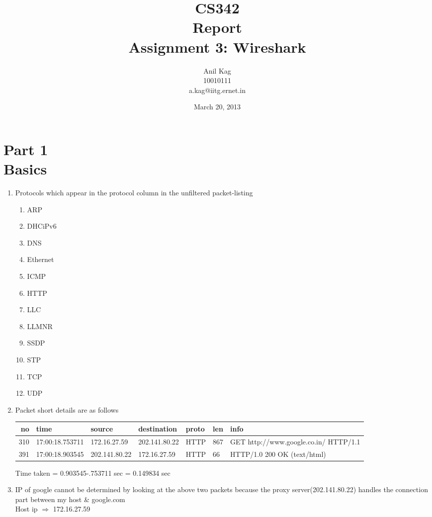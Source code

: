 \documentclass[a4,11pt]{article}
\begin{document}
\title{CS342 \\
	Report\\
	Assignment 3: Wireshark}
\author{Anil Kag\\
	   10010111\\
	   a.kag@iitg.ernet.in}
\date{March 20, 2013}
\maketitle

\section{Part 1\\
	  Basics}
\begin{enumerate}
 \item Protocols which appear in the protocol column in the unfiltered packet-listing
    \begin{multicols}{3}
      \begin{enumerate}
      \item ARP  	\item DHCiPv6
      \item DNS 	\item Ethernet 
      \item ICMP      	\item HTTP
      \item LLC        \item LLMNR
      \item SSDP       \item STP 
      \item TCP       	\item UDP
      \end{enumerate}
    \end{multicols}
    
    \item  Packet short details are as follows \\
      \begin{adjustwidth}{-2cm}{}
      \begin{tabular}{|r|l|l|l|l|l| p{4cm} |}
       \hline
       no&	time&			source&			destination&		proto&	len&	info \\
       \hline
       310& 	17:00:18.753711& 	172.16.27.59& 		202.141.80.22& 		HTTP& 	867& 	GET http://www.google.co.in/ HTTP/1.1 \\
       391& 	17:00:18.903545&	202.141.80.22&		172.16.27.59&		HTTP&	66&	HTTP/1.0 200 OK  (text/html)\\
       \hline
      \end{tabular}
      \end{adjustwidth}

      Time taken = 0.903545-.753711 sec = 0.149834 sec

      \item IP of google cannot be determined by looking at the above two packets because the proxy server(202.141.80.22) handles
	      the connection part between my host \& google.com \\

	    Host ip $\Rightarrow$ 172.16.27.59
\end{enumerate}
	  
\end{document}
